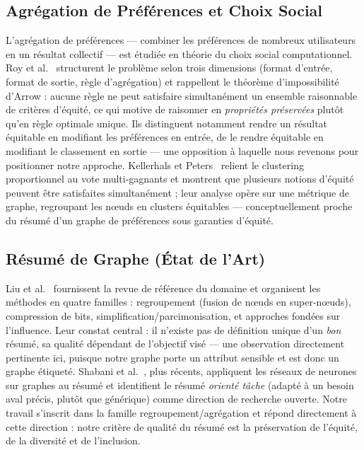 \documentclass[12pt]{report}
\begin{document}
\subsection{Agrégation de Préférences et Choix Social}

L'agrégation de préférences --- combiner les préférences de nombreux
utilisateurs en un résultat collectif --- est étudiée en théorie du choix
social computationnel. Roy et al.~\cite{roy_fairness_2024} structurent le
problème selon trois dimensions (format d'entrée, format de sortie,
règle d'agrégation) et rappellent le théorème d'impossibilité d'Arrow :
aucune règle ne peut satisfaire simultanément un ensemble raisonnable de
critères d'équité, ce qui motive de raisonner en \emph{propriétés
préservées} plutôt qu'en règle optimale unique. Ils distinguent
notamment rendre un résultat équitable en modifiant les préférences en
entrée, de le rendre équitable en modifiant le classement en sortie ---
une opposition à laquelle nous revenons pour positionner notre approche.
Kellerhals et Peters~\cite{kellerhals_proportional_2024} relient le
clustering proportionnel au vote multi-gagnants et montrent que
plusieurs notions d'équité peuvent être satisfaites simultanément ; leur
analyse opère sur une métrique de graphe, regroupant les nœuds en
clusters équitables --- conceptuellement proche du résumé d'un graphe de
préférences sous garanties d'équité.

\subsection{Résumé de Graphe (État de l'Art)}

Liu et al.~\cite{liu_graph_2018} fournissent la revue de référence du
domaine et organisent les méthodes en quatre familles : regroupement
(fusion de nœuds en super-nœuds), compression de bits,
simplification/parcimonisation, et approches fondées sur l'influence.
Leur constat central : il n'existe pas de définition unique d'un
\emph{bon} résumé, sa qualité dépendant de l'objectif visé --- une
observation directement pertinente ici, puisque notre graphe porte un
attribut sensible et est donc un graphe étiqueté. Shabani et
al.~\cite{shabani_comprehensive_2024}, plus récents, appliquent les
réseaux de neurones sur graphes au résumé et identifient le résumé
\emph{orienté tâche} (adapté à un besoin aval précis, plutôt que
générique) comme direction de recherche ouverte. Notre travail
s'inscrit dans la famille regroupement/agrégation et répond directement
à cette direction : notre critère de qualité du résumé est la
préservation de l'équité, de la diversité et de l'inclusion.
\end{document}
